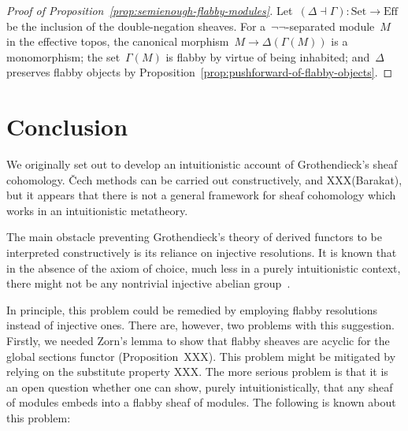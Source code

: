 \documentclass[oneside]{amsart}
\theoremstyle{definition}
\theoremstyle{plain}
\theoremstyle{remark}
\newcommand{\Set}{\mathrm{Set}}
\newcommand{\Eff}{\mathrm{Ef{}f}}
\renewcommand{\_}{\mathpunct{.}\,}
\begin{document}
\begin{proof}[Proof of Proposition~\ref{prop:semienough-flabby-modules}]
Let~$(\Delta \dashv \Gamma) : \Set \to \Eff$ be the inclusion of the
double-negation sheaves. For a~$\neg\neg$-separated module~$M$ in the effective
topos, the canonical morphism~$M \to \Delta(\Gamma(M))$ is a monomorphism; the
set~$\Gamma(M)$ is flabby by virtue of being inhabited; and~$\Delta$ preserves
flabby objects by Proposition~\ref{prop:pushforward-of-flabby-objects}.
\end{proof}


\section{Conclusion}
\label{sect:conclusion}

We originally set out to develop an intuitionistic account of Grothendieck's
sheaf cohomology. Čech methods can be carried out constructively, and
XXX(Barakat), but it appears that there is not a general framework for sheaf
cohomology which works in an intuitionistic metatheory.

The main obstacle preventing Grothendieck's theory of derived functors to be interpreted
constructively is its reliance on injective resolutions. It is known that in
the absence of the axiom of choice, much less in a purely intuitionistic
context, there might not be any nontrivial injective abelian
group~\cite{blass:inj-proj-axc}.

In principle, this problem could be remedied by employing flabby resolutions
instead of injective ones. There are, however, two problems with this
suggestion. Firstly, we needed Zorn's lemma to show that flabby sheaves are
acyclic for the global sections functor (Proposition~XXX). This problem might
be mitigated by relying on the substitute property XXX.
The more serious problem is that it is an open question whether
one can show, purely intuitionistically, that any sheaf of modules embeds into
a flabby sheaf of modules. The following is known about this problem:
\end{document}
